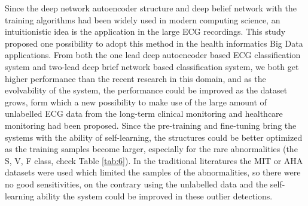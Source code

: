 \documentclass[graybox]{svmult}
\begin{document}
Since the deep network autoencoder structure and deep belief network with the training algorithms had been widely used in modern computing science, an intuitionistic idea is the application in the large ECG recordings. This study proposed one possibility to adopt this method in the health informatics Big Data applications. From both the one lead deep autoencoder based ECG classification system and two-lead deep brief network based classification system, we both get higher performance than the recent research in this domain, and as the evolvability of the system, the performance could be improved as the dataset grows, form which a new possibility to make use of the large amount of unlabelled ECG data from the long-term clinical monitoring and healthcare monitoring had been proposed. Since the pre-training and fine-tuning bring the systems with  the ability of self-learning, the structures could be better optimized as the training samples become larger, especially for the rare abnormalities (the S, V, F class, check Table \ref{tab:6}). In the traditional literatures the MIT or AHA datasets were used which limited the samples of the abnormalities, so there were no good sensitivities, on the contrary using the unlabelled data and the self-learning ability the system could be improved in these outlier detections.


%
%



\end{document}

